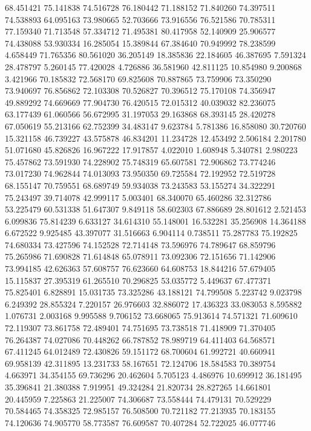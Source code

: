 68.451421
75.141838
74.516728
76.180442
71.188152
71.840260
74.397511
74.538893
64.095163
73.980665
52.703666
73.916556
76.521586
70.785311
77.159340
71.713548
57.334712
71.495381
80.417958
52.140909
25.906577
74.438088
53.930334
16.285054
15.389844
67.384640
70.949992
78.238599
4.658449
71.765356
80.561020
36.205149
18.385836
22.184605
46.387695
7.591324
28.478797
5.260145
77.420028
4.726886
36.581960
42.811125
10.854980
9.200868
3.421966
70.185832
72.568170
69.825608
70.887865
73.759906
73.350290
73.940697
76.856862
72.103308
70.526827
70.396512
75.170108
74.356947
49.889292
74.669669
77.904730
76.420515
72.015312
40.039032
82.236075
63.177439
61.060566
56.672995
31.197053
29.163868
68.393145
28.420278
67.050619
55.213166
62.752399
34.483147
9.623784
5.781386
16.858080
30.720760
15.321158
46.739227
43.575878
46.834201
11.234728
12.453492
2.506184
2.201780
51.071680
45.826826
16.967222
17.917857
4.022010
1.608948
5.340781
2.980223
75.457862
73.591930
74.228902
75.748319
65.607581
72.906862
73.774246
73.017230
74.962844
74.013093
73.950350
69.725584
72.192952
72.519728
68.155147
70.759551
68.689749
59.934038
73.243583
53.155274
34.322291
75.243497
39.714078
42.999117
5.003401
68.340070
65.460286
32.312786
53.225479
60.531338
51.647307
9.849118
58.602303
67.886689
28.801612
2.521453
6.099836
75.814239
6.633127
34.614310
55.148001
16.532281
35.256908
14.364188
6.672522
9.925485
43.397077
31.516663
6.904114
0.738511
75.287783
75.192825
74.680334
73.427596
74.152528
72.714148
73.596976
74.789647
68.859796
75.265986
71.690828
71.614848
65.078911
73.092306
72.151656
71.142906
73.994185
42.626363
57.608757
76.623660
64.608753
18.844216
57.679405
15.115837
27.395319
61.265510
70.296825
53.035772
5.449637
67.477371
75.825401
6.828891
15.031735
73.325286
43.188121
74.799508
5.223742
9.023798
6.249392
28.855324
7.220157
26.976603
32.886072
17.436323
33.083053
8.595882
1.076731
2.003168
9.995588
9.706152
73.668065
75.913614
74.571321
71.609610
72.119307
73.861758
72.489401
74.751695
73.738518
71.418909
71.370405
76.264387
74.027086
70.448262
66.787852
78.989719
64.411403
64.568571
67.411245
64.012489
72.430826
59.151172
68.700604
61.992721
40.660941
69.958139
42.311895
13.231733
58.167651
72.124706
18.584583
70.389754
4.663971
34.354155
69.736296
20.462604
5.705123
4.486976
10.699912
36.181495
35.396841
21.380388
7.919951
49.324284
21.820734
28.827265
14.661801
20.445959
7.225863
21.225007
74.306687
73.558444
74.479131
70.529229
70.584465
74.358325
72.985157
76.508500
70.721182
77.213935
70.183155
74.120636
74.905770
58.773587
76.609587
70.407284
52.722025
46.077746

